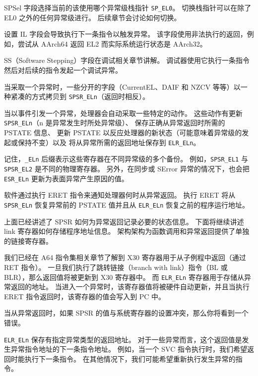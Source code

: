 SPSel 字段选择当前的该使用哪个异常级栈指针 \lstinline!SP_EL0!。
切换栈指针可以在除了 EL0 之外的任何异常级进行。
后续章节会讨论如何切换。

设置 IL 字段会导致执行下一条指令以触发异常。
该字段使用非法执行的返回，例如，尝试从 AArch64 返回 EL2 而实际系统运行状态是 AArch32。

SS（Software Stepping）字段在调试相关章节讲解。
调试器使用它执行一条指令然后对后续的指令发起一个调试异常。

当采取一个异常时，一些分开的字段（CurrentEL、DAIF 和 NZCV 等等）以一种紧凑的方式拷贝到 \lstinline!SPSR_ELn!（返回时相反）。

当以事件引发一个异常，处理器会自动采取一些特定的动作。
这些动作有更新 \lstinline!SPSR_ELn!（n 是异常发生时所处异常级）、
保存正确从异常返回时所需的 PSTATE 信息、
更新 PSTATE 以反应处理器的新状态（可能意味着异常级的发起或保持不变）以及
将从异常所需的返回地址保存到 \lstinline!ELR_ELn!。


记住，\lstinline!_ELn! 后缀表示这些寄存器在不同异常级的多个备份。
例如，\lstinline!SPSR_EL1! 与 \lstinline!SPSR_EL2! 是不同的物理寄存器。
另外，在同步或 SError 异常的情况下，也会把 \lstinline!ESR_ELn! 更新为表面异常产生原因的值。

软件通过执行 ERET 指令来通知处理器何时从异常返回。
执行 ERET 将从 \lstinline!SPSR_ELn! 恢复异常前的 PSTATE 值并且从 \lstinline!ELR_ELn! 恢复之前的程序运行地址。 

上面已经讲述了 SPSR 如何为异常返回记录必要的状态信息。
下面将继续讲述 link 寄存器如何存储程序地址信息。
架构架构为函数调用和异常返回提供了单独的链接寄存器。

我们已经在 A64 指令集相关章节了解到 X30 寄存器用于从子例程中返回（通过 RET 指令）。
一旦我们执行了跳转链接（branch with link）指令（BL 或 BLR），那么返回值将被更新到 X30 寄存器中。
而 \lstinline!ELR_ELn! 寄存器用于存储从异常返回的地址。
当进入一个异常时，该寄存器值将被硬件自动更新，并且当执行 ERET 指令返回时，该寄存器的值会写入到 PC 中。

\begin{Tcbox}[title={Note}]
  当从异常返回时，如果 SPSR 的值与系统寄存器的设置冲突，那么你将看到一个错误。
\end{Tcbox}

\lstinline!ELR_ELn! 保存有指定异常类型的返回地址。
对于一些异常而言，这个返回值是发生异常指令地址的下一条指令地址。
例如，当一个 SVC 指令执行时，我们希望返回时能执行下一条指令。
在其他情况下，我们可能希望重新执行发生异常的指令。

